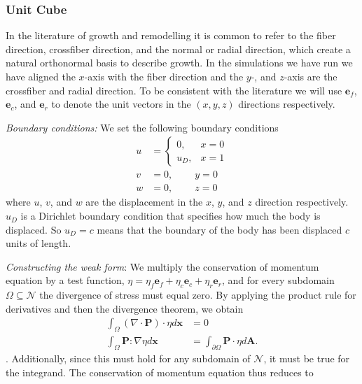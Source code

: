 \subsubsection{Unit Cube}
\label{subsec: experiments}
In the literature of growth and remodelling it is common to refer to the fiber direction, crossfiber direction, and the normal or radial direction, which create a natural orthonormal basis to describe growth. In the simulations we have run we have aligned the $x$-axis with the fiber direction and the $y$-, and $z$-axis are the crossfiber and radial direction. To be consistent with the literature we will use $\mathbf{e}_f$, $\mathbf{e}_c$, and $\mathbf{e}_r$ to denote the unit vectors in the $(x, y, z)$ directions respectively.  \par
\emph{Boundary conditions:} We set the following boundary conditions
\begin{align*}
    u &= \begin{cases}
        0, & x = 0 \\
        u_D, & x = 1
    \end{cases} \\
    v &= 0, \qquad \ y = 0 \\
    w &= 0, \qquad \ z = 0
\end{align*}
where $u$, $v$, and $w$ are the displacement in the $x$, $y$, and $z$ direction respectively. $u_D$ is a Dirichlet boundary condition that specifies how much the body is displaced. So $u_D = c$ means that the boundary of the body has been displaced $c$ units of length.
\par
\emph{Constructing the weak form}: We multiply the conservation of momentum equation by a test function, $\eta =  \eta_f\mathbf{e}_f + \eta_c\mathbf{e}_c + \eta_r\mathbf{e}_r$, and for every subdomain $\Omega \subseteq \mathcal{N}$ the divergence of stress must equal zero. By applying the product rule for derivatives and then the divergence theorem, we obtain
\begin{align*}
    \int_\Omega(\nabla\cdot\mathbf{P})\cdot\eta d\mathbf{x} &= 0 \\
    \int_\Omega \mathbf{P} : \nabla\eta d\mathbf{x} &= \int_{\partial\Omega}\mathbf{P}\cdot\eta d\mathbf{A}.
\end{align*}
. Additionally, since this must hold for any subdomain of $\mathcal{N}$, it must be true for the integrand. The conservation of momentum equation thus reduces to
